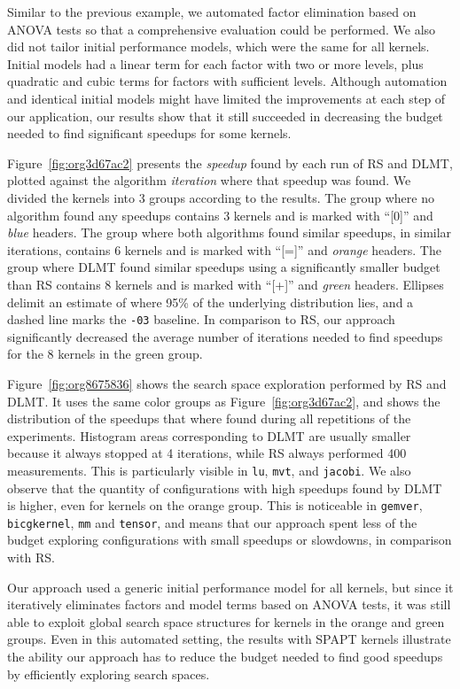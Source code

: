 \documentclass[conference]{IEEEtran}
\begin{document}
Similar to the previous example, we automated factor elimination based on ANOVA
tests so that a comprehensive evaluation could be performed. We also did not
tailor initial performance models, which were the same for all kernels.
Initial models had a linear term for each factor with two or more levels, plus
quadratic and cubic terms for factors with sufficient levels. Although
automation and identical initial models might have limited the improvements at
each step of our application, our results show that it still succeeded in
decreasing the budget needed to find significant speedups for some kernels.

Figure~\ref{fig:org3d67ac2} presents the \emph{speedup} found by each
run of RS and DLMT, plotted against the algorithm \emph{iteration} where that speedup
was found. We divided the kernels into 3 groups according to the results. The
group where no algorithm found any speedups contains 3 kernels and is marked
with ``[0]'' and \emph{blue} headers. The group where both algorithms found similar
speedups, in similar iterations, contains 6 kernels and is marked with ``[=]''
and \emph{orange} headers. The group where DLMT found similar speedups using a
significantly smaller budget than RS contains 8 kernels and is marked with
``[+]'' and \emph{green} headers. Ellipses delimit an estimate of where 95\% of the
underlying distribution lies, and a dashed line marks the \texttt{-03} baseline.
In comparison to RS, our approach significantly decreased the average number of
iterations needed to find speedups for the 8 kernels in the green group.

Figure~\ref{fig:org8675836} shows the search space exploration performed
by RS and DLMT. It uses the same color groups as
Figure~\ref{fig:org3d67ac2}, and shows the distribution of the
speedups that where found during all repetitions of the experiments. Histogram
areas corresponding to DLMT are usually smaller because it always stopped at 4
iterations, while RS always performed 400 measurements. This is particularly
visible in \texttt{lu}, \texttt{mvt}, and \texttt{jacobi}. We also observe that the quantity of
configurations with high speedups found by DLMT is higher, even for kernels on
the orange group. This is noticeable in \texttt{gemver}, \texttt{bicgkernel}, \texttt{mm} and
\texttt{tensor}, and means that our approach spent less of the budget exploring
configurations with small speedups or slowdowns, in comparison with RS.

Our approach used a generic initial performance model for all kernels, but
since it iteratively eliminates factors and model terms based on ANOVA tests,
it was still able to exploit global search space structures for kernels in the orange
and green groups. Even in this automated setting, the results with SPAPT kernels
illustrate the ability our approach has to reduce the budget needed to find good
speedups by efficiently exploring search spaces.
\end{document}
